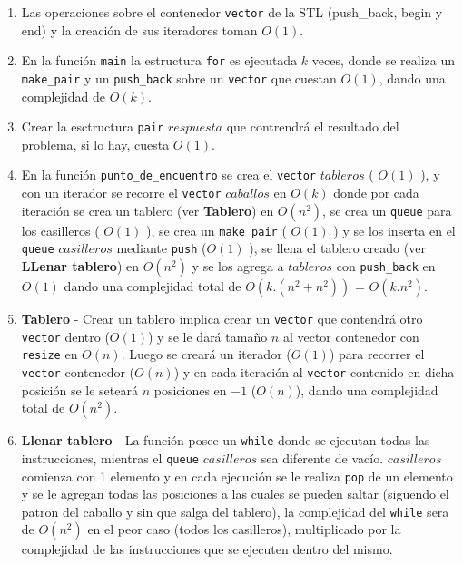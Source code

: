 \begin{enumerate}

 \item Las operaciones sobre el contenedor \verb|vector| de la STL (push_back,
 begin y end) y la creación de sus iteradores toman $O(1)$.

 \item En la función \verb|main| la estructura \verb|for| es ejecutada
  $k$ veces, donde se realiza un \verb|make_pair| y un \verb|push_back|
  sobre un \verb|vector| que cuestan $O(1)$, dando una complejidad de $O(k)$.

 \item Crear la esctructura \verb|pair| $respuesta$ que contrendrá el
 resultado del problema, si lo hay, cuesta $O(1)$.

 \item En la función \verb|punto_de_encuentro| se crea el \verb|vector|
 $tableros$ ( $O(1)$ ), y con un iterador se recorre el \verb|vector| $caballos$ en
 $O(k)$ donde por cada iteración se crea un tablero (ver \textbf{Tablero})
 en $O(n^{2})$, se crea un \verb|queue| para los casilleros ( $O(1)$ ),
 se crea un \verb|make_pair| ( $O(1)$ ) y se los inserta en el \verb|queue| $casilleros$
 mediante \verb|push| ($ O(1)$ ), se llena el tablero creado (ver \textbf{LLenar tablero})
 en $O(n^{2})$ y se los agrega a $tableros$ con \verb|push_back| en $O(1)$
  dando una complejidad total de $O(k.(n^{2} + n^{2}))$ = $O(k.n^{2})$.

 \item \textbf{Tablero} - Crear un tablero implica crear un \verb|vector|
 que contendrá otro \verb|vector| dentro ($O(1)$) y se le dará tamaño $n$
 al vector contenedor con \verb|resize| en $O(n)$. Luego se creará un iterador
 ($O(1)$) para recorrer el \verb|vector| contenedor ($O(n)$) y en cada iteración
 al \verb|vector| contenido en dicha posición se le seteará $n$ posiciones
 en $-1$ ($O(n)$), dando una complejidad total de $O(n^{2})$.

 \item \textbf{Llenar tablero} - La función posee un \verb|while| donde se ejecutan
 todas las instrucciones, mientras el \verb|queue| $casilleros$ sea diferente de vacío.
 $casilleros$ comienza con 1 elemento y en cada ejecución se le realiza
 \verb|pop| de un elemento y se le agregan todas las posiciones a las cuales se
 pueden saltar (siguendo el patron del caballo y sin que salga del tablero), la
 complejidad del \verb|while| sera de $O(n^{2})$ en el peor caso (todos los casilleros), multiplicado
 por la complejidad de las instrucciones que se ejecuten dentro del mismo.


\end{enumerate}
